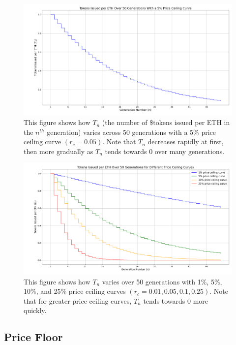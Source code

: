 \documentclass{article}
\begin{document}
\begin{figure}[h]\label{fig:single-ceiling-curve}
  \centering
  \includegraphics[width=\textwidth]{figures/single-ceiling-curve.png}
   \caption{This figure shows how $T_n$ (the number of \$tokens issued per ETH in the $n^{th}$ generation) varies across 50 generations with a 5\% price ceiling curve $(r_c = 0.05)$. Note that $T_n$ decreases rapidly at first, then more gradually as $T_n$ tends towards 0 over many generations.}
\end{figure}


\begin{figure}[h]
  \centering
  \includegraphics[width=\textwidth]{figures/multi-ceiling-curves.png}
  \caption{This figure shows how $T_n$ varies over 50 generations with 1\%, 5\%, 10\%, and 25\% price ceiling curves $(r_c = 0.01, 0.05, 0.1, 0.25)$. Note that for greater price ceiling curves, $T_n$ tends towards 0 more quickly.}
\end{figure}

\subsection{Price Floor}
\end{document}
